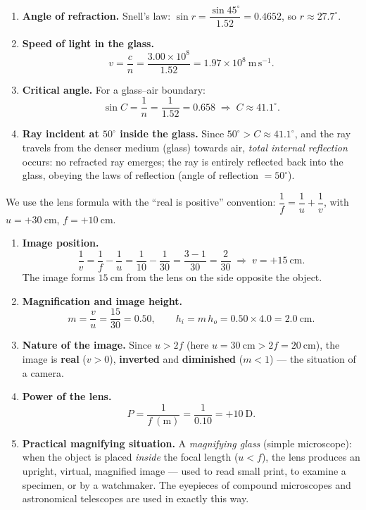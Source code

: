 \documentclass[11pt]{article}
\begin{document}
\begin{corrige}
\begin{enumerate}
\item \textbf{Angle of refraction.} Snell's law: $\sin r = \dfrac{\sin 45^{\circ}}{1.52} = 0.4652$, so $r \approx 27.7^{\circ}$.

\item \textbf{Speed of light in the glass.}
\[ v = \frac{c}{n} = \frac{3.00\times10^{8}}{1.52} = 1.97\times10^{8}\ \mathrm{m\,s^{-1}}. \]

\item \textbf{Critical angle.} For a glass--air boundary:
\[ \sin C = \frac{1}{n} = \frac{1}{1.52} = 0.658 \;\Rightarrow\; C \approx 41.1^{\circ}. \]

\item \textbf{Ray incident at $50^{\circ}$ inside the glass.} Since $50^{\circ} > C \approx 41.1^{\circ}$, and the ray travels from the denser medium (glass) towards air, \emph{total internal reflection} occurs: no refracted ray emerges; the ray is entirely reflected back into the glass, obeying the laws of reflection (angle of reflection $= 50^{\circ}$).
\end{enumerate}
\end{corrige}

\begin{corrige}
We use the lens formula with the ``real is positive'' convention: $\dfrac{1}{f} = \dfrac{1}{u} + \dfrac{1}{v}$, with $u = +30\ \mathrm{cm}$, $f = +10\ \mathrm{cm}$.
\begin{enumerate}
\item \textbf{Image position.}
\[ \frac{1}{v} = \frac{1}{f} - \frac{1}{u} = \frac{1}{10} - \frac{1}{30} = \frac{3-1}{30} = \frac{2}{30} \;\Rightarrow\; v = +15\ \mathrm{cm}. \]
The image forms $15\ \mathrm{cm}$ from the lens on the side opposite the object.

\item \textbf{Magnification and image height.}
\[ m = \frac{v}{u} = \frac{15}{30} = 0.50, \qquad h_{i} = m\,h_{o} = 0.50\times 4.0 = 2.0\ \mathrm{cm}. \]

\item \textbf{Nature of the image.} Since $u > 2f$ (here $u = 30\ \mathrm{cm} > 2f = 20\ \mathrm{cm}$), the image is \textbf{real} ($v>0$), \textbf{inverted} and \textbf{diminished} ($m<1$) — the situation of a camera.

\item \textbf{Power of the lens.}
\[ P = \frac{1}{f\ (\mathrm{m})} = \frac{1}{0.10} = +10\ \mathrm{D}. \]

\item \textbf{Practical magnifying situation.} A \emph{magnifying glass} (simple microscope): when the object is placed \emph{inside} the focal length ($u < f$), the lens produces an upright, virtual, magnified image — used to read small print, to examine a specimen, or by a watchmaker. The eyepieces of compound microscopes and astronomical telescopes are used in exactly this way.
\end{enumerate}
\end{corrige}
\end{document}
